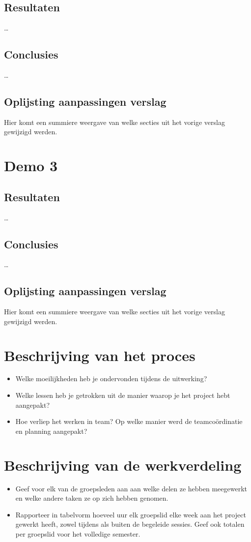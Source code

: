 \documentclass[tt1]{penoverslag}
\begin{document}
\subsection{Resultaten}
\ldots

\subsection{Conclusies}
\ldots

\subsection{Oplijsting aanpassingen verslag}
Hier komt een summiere weergave van welke secties uit het vorige verslag gewijzigd werden.


\section{Demo 3}

\subsection{Resultaten}
\ldots

\subsection{Conclusies}
\ldots

\subsection{Oplijsting aanpassingen verslag}
Hier komt een summiere weergave van welke secties uit het vorige verslag gewijzigd werden.


\section{Beschrijving van het proces}
\begin{itemize}
\item Welke moeilijkheden heb je ondervonden tijdens de uitwerking?
\item Welke lessen heb je getrokken uit de manier waarop je het project hebt aangepakt?
\item Hoe verliep het werken in team? Op welke manier werd de teamco\"ordinatie en planning aangepakt?
\end{itemize}


\section{Beschrijving van de werkverdeling}
\begin{itemize}
\item Geef voor elk van de groepsleden aan aan welke delen ze hebben meegewerkt en welke andere taken ze op zich hebben genomen.
\item Rapporteer in tabelvorm hoeveel uur elk groepslid elke week aan het project gewerkt heeft, zowel tijdens als buiten de begeleide sessies. Geef ook totalen per groepslid voor het volledige semester.
\end{itemize}
\end{document}
